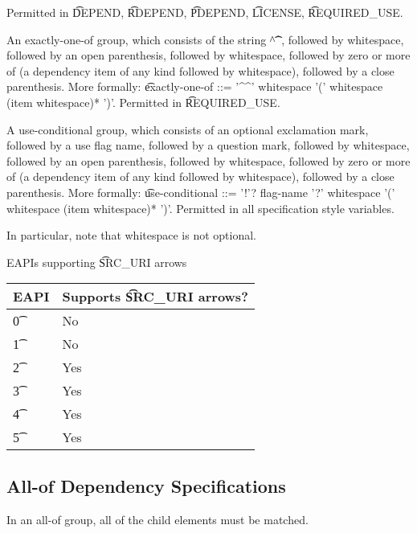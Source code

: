 \begin{compactitem}
    Permitted in \t{DEPEND}, \t{RDEPEND}, \t{PDEPEND}, \t{LICENSE}, \t{REQUIRED\_USE}.
\item An exactly-one-of group, which consists of the string \t{\textasciicircum\textasciicircum},
    followed by whitespace, followed by an open parenthesis, followed by whitespace, followed by
    zero or more of (a dependency item of any kind followed by whitespace), followed by a close
    parenthesis. More formally: \t{exactly-one-of ::= '\textasciicircum\textasciicircum' whitespace
    '(' whitespace (item whitespace)* ')'}.
    Permitted in \t{REQUIRED\_USE}.
\item A use-conditional group, which consists of an optional exclamation mark, followed by
    a use flag name, followed by a question mark, followed by whitespace, followed by
    an open parenthesis, followed by whitespace, followed by zero or more of (a dependency item
    of any kind followed by whitespace), followed by a close parenthesis. More formally:
    \t{use-conditional ::= '!'? flag-name '?' whitespace '(' whitespace (item whitespace)* ')'}.
    Permitted in all specification style variables.
\end{compactitem}

In particular, note that whitespace is not optional.

\begin{centertable}{EAPIs supporting \t{SRC\_URI} arrows} \label{tab:uri-arrows-table}
    \begin{tabular}{ l l }
        \toprule
        \multicolumn{1}{c}{\textbf{EAPI}} &
        \multicolumn{1}{c}{\textbf{Supports \t{SRC\_URI} arrows?}} \\
        \midrule
    \t{0} & No \\
    \t{1} & No \\
    \t{2} & Yes \\
    \t{3} & Yes \\
    \t{4} & Yes \\
    \t{5} & Yes \\
    \bottomrule
    \end{tabular}
\end{centertable}

\subsection{All-of Dependency Specifications}

In an all-of group, all of the child elements must be matched.

